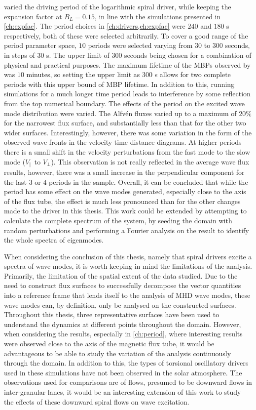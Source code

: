  varied the driving period of the logarithmic spiral driver, while keeping the expansion factor at $B_L = 0.15$, in line with the simulations presented in \cref{ch:expfac}.
The period choices in \cref{ch:drivers,ch:expfac} were $240$ and $180$ s respectively, both of these were selected arbitrarily.
To cover a good range of the period parameter space, $10$ periods were selected varying from $30$ to $300$ seconds, in steps of $30$ s.
The upper limit of $300$ seconds being chosen for a combination of physical and practical purposes.
The maximum lifetime of the MBPs observed by \cite{sanchezalmeida2004} was $10$ minutes, so setting the upper limit as $300$ s allows for two complete periods with this upper bound of MBP lifetime.
In addition to this, running simulations for a much longer time period leads to interference by some reflection from the top numerical boundary.
The effects of the period on the excited wave mode distribution were varied.
The Alfv\'en fluxes varied up to a maximum of $20$\% for the narrowest flux surface, and substantially less than that for the other two wider surfaces.
Interestingly, however, there was some variation in the form of the observed wave fronts in the velocity time-distance diagrams.
At higher periods there is a small shift in the velocity perturbations from the fast mode to the slow mode ($V_\parallel$ to $V_\perp$).
This observation is not really reflected in the average wave flux results, however, there was a small increase in the perpendicular component for the last $3$ or $4$ periods in the sample.
Overall, it can be concluded that while the period has some effect on the wave modes generated, especially close to the axis of the flux tube, the effect is much less pronounced than for the other changes made to the driver in this thesis.
This work could be extended by attempting to calculate the complete spectrum of the system, by seeding the domain with random perturbations and performing a Fourier analysis on the result to identify the whole spectra of eigenmodes. 

When considering the conclusion of this thesis, namely that spiral drivers excite a spectra of wave modes, it is worth keeping in mind the limitations of the analysis.
Primarily, the limitation of the spatial extent of the data studied.
Due to the need to construct flux surfaces to successfully decompose the vector quantities into a reference frame that lends itself to the analysis of MHD wave modes, these wave modes can, by definition, only be analysed on the constructed surfaces.
Throughout this thesis, three representative surfaces have been used to understand the dynamics at different points throughout the domain.
However, when considering the results, especially in \cref{ch:period}, where interesting results were observed close to the axis of the magnetic flux tube, it would be advantageous to be able to study the variation of the analysis continuously through the domain. 
In addition to this, the types of torsional oscillatory drivers used in these simulations have not been observed in the solar atmosphere.
The observations used for comparisons are of flows, presumed to be downward flows in inter-granular lanes, it would be an interesting extension of this work to study the effects of these downward spiral flows on wave excitation.

